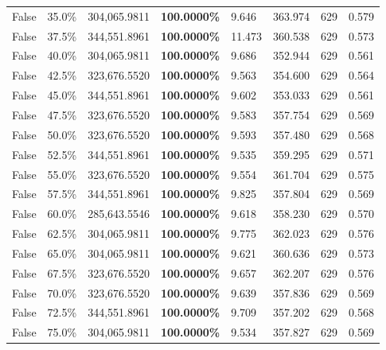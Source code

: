 \begin{table}[H]
\begin{tabular}{|m{}| m{}| r | R{0.13\textwidth}| R{0.09\textwidth}| R{0.09\textwidth}| R{0.09\textwidth}| R{0.11\textwidth} |}
False & 35.0\% & 304,065.9811 & \bfseries \color{red} 100.0000\% & 9.646 & 363.974 & 629 & 0.579 \\
False & 37.5\% & 344,551.8961 & \bfseries \color{red} 100.0000\% & 11.473 & 360.538 & 629 & 0.573 \\
False & 40.0\% & 304,065.9811 & \bfseries \color{red} 100.0000\% & 9.686 & 352.944 & 629 & 0.561 \\
False & 42.5\% & 323,676.5520 & \bfseries \color{red} 100.0000\% & 9.563 & 354.600 & 629 & 0.564 \\
False & 45.0\% & 344,551.8961 & \bfseries \color{red} 100.0000\% & 9.602 & 353.033 & 629 & 0.561 \\
False & 47.5\% & 323,676.5520 & \bfseries \color{red} 100.0000\% & 9.583 & 357.754 & 629 & 0.569 \\
False & 50.0\% & 323,676.5520 & \bfseries \color{red} 100.0000\% & 9.593 & 357.480 & 629 & 0.568 \\
False & 52.5\% & 344,551.8961 & \bfseries \color{red} 100.0000\% & 9.535 & 359.295 & 629 & 0.571 \\
False & 55.0\% & 323,676.5520 & \bfseries \color{red} 100.0000\% & 9.554 & 361.704 & 629 & 0.575 \\
False & 57.5\% & 344,551.8961 & \bfseries \color{red} 100.0000\% & 9.825 & 357.804 & 629 & 0.569 \\
False & 60.0\% & \color{red} 285,643.5546 & \bfseries \color{red} 100.0000\% & 9.618 & 358.230 & 629 & 0.570 \\
False & 62.5\% & 304,065.9811 & \bfseries \color{red} 100.0000\% & 9.775 & 362.023 & 629 & 0.576 \\
False & 65.0\% & 304,065.9811 & \bfseries \color{red} 100.0000\% & 9.621 & 360.636 & 629 & 0.573 \\
False & 67.5\% & 323,676.5520 & \bfseries \color{red} 100.0000\% & 9.657 & 362.207 & 629 & 0.576 \\
False & 70.0\% & 323,676.5520 & \bfseries \color{red} 100.0000\% & 9.639 & 357.836 & 629 & 0.569 \\
False & 72.5\% & 344,551.8961 & \bfseries \color{red} 100.0000\% & 9.709 & 357.202 & 629 & 0.568 \\
False & 75.0\% & 304,065.9811 & \bfseries \color{red} 100.0000\% & 9.534 & 357.827 & 629 & 0.569 \\

\end{tabular}
\end{table}
